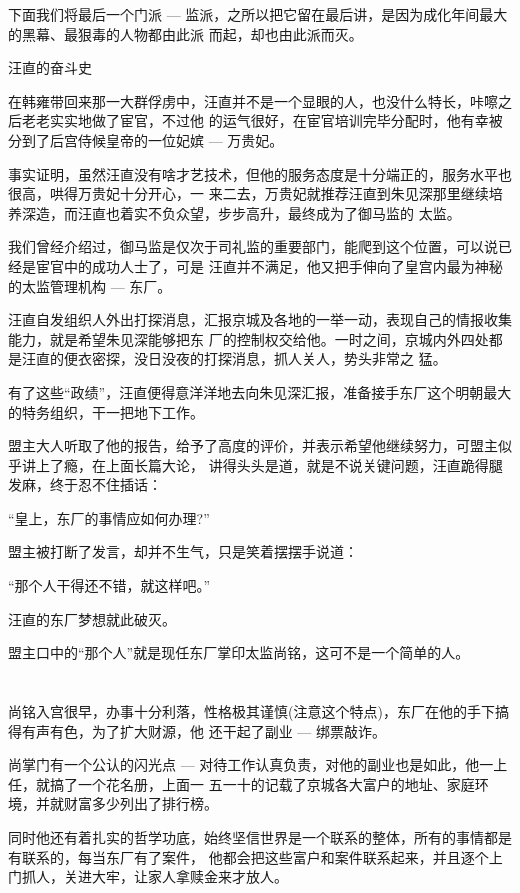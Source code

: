 \documentclass[11pt,a4paper,onecolumn]{article}
\begin{document}
下面我们将最后一个门派 --- 监派，之所以把它留在最后讲，是因为成化年间最大的黑幕、最狠毒的人物都由此派
而起，却也由此派而灭。

汪直的奋斗史

在韩雍带回来那一大群俘虏中，汪直并不是一个显眼的人，也没什么特长，咔嚓之后老老实实地做了宦官，不过他
的运气很好，在宦官培训完毕分配时，他有幸被分到了后宫侍候皇帝的一位妃嫔 --- 万贵妃。

事实证明，虽然汪直没有啥才艺技术，但他的服务态度是十分端正的，服务水平也很高，哄得万贵妃十分开心，一
来二去，万贵妃就推荐汪直到朱见深那里继续培养深造，而汪直也着实不负众望，步步高升，最终成为了御马监的
太监。

我们曾经介绍过，御马监是仅次于司礼监的重要部门，能爬到这个位置，可以说已经是宦官中的成功人士了，可是
汪直并不满足，他又把手伸向了皇宫内最为神秘的太监管理机构 --- 东厂。

汪直自发组织人外出打探消息，汇报京城及各地的一举一动，表现自己的情报收集能力，就是希望朱见深能够把东
厂的控制权交给他。一时之间，京城内外四处都是汪直的便衣密探，没日没夜的打探消息，抓人关人，势头非常之
猛。

有了这些``政绩''，汪直便得意洋洋地去向朱见深汇报，准备接手东厂这个明朝最大的特务组织，干一把地下工作。

盟主大人听取了他的报告，给予了高度的评价，并表示希望他继续努力，可盟主似乎讲上了瘾，在上面长篇大论，
讲得头头是道，就是不说关键问题，汪直跪得腿发麻，终于忍不住插话：

``皇上，东厂的事情应如何办理?''

盟主被打断了发言，却并不生气，只是笑着摆摆手说道：

``那个人干得还不错，就这样吧。''

汪直的东厂梦想就此破灭。

盟主口中的``那个人''就是现任东厂掌印太监尚铭，这可不是一个简单的人。

\section[\thesection]{}

尚铭入宫很早，办事十分利落，性格极其谨慎(注意这个特点)，东厂在他的手下搞得有声有色，为了扩大财源，他
还干起了副业 --- 绑票敲诈。

尚掌门有一个公认的闪光点 --- 对待工作认真负责，对他的副业也是如此，他一上任，就搞了一个花名册，上面一
五一十的记载了京城各大富户的地址、家庭环境，并就财富多少列出了排行榜。

同时他还有着扎实的哲学功底，始终坚信世界是一个联系的整体，所有的事情都是有联系的，每当东厂有了案件，
他都会把这些富户和案件联系起来，并且逐个上门抓人，关进大牢，让家人拿赎金来才放人。
\end{document}
